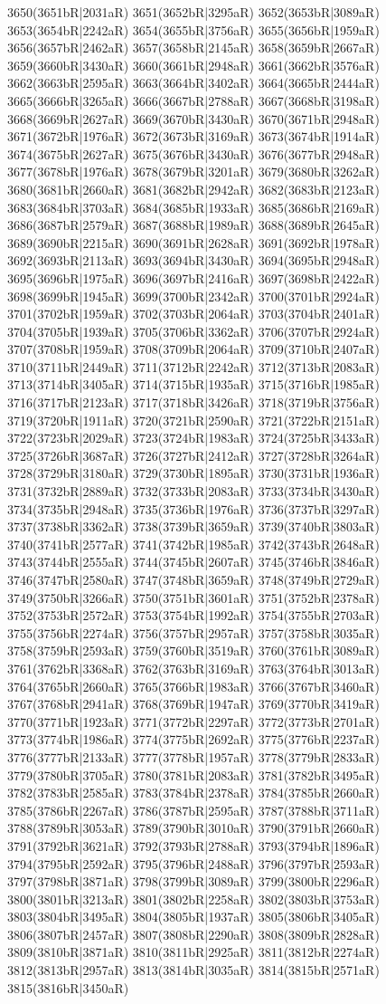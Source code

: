 3650(3651bR|2031aR) 3651(3652bR|3295aR) 3652(3653bR|3089aR) 3653(3654bR|2242aR) 3654(3655bR|3756aR) 3655(3656bR|1959aR) 3656(3657bR|2462aR) 3657(3658bR|2145aR) 3658(3659bR|2667aR) 3659(3660bR|3430aR) 3660(3661bR|2948aR) 3661(3662bR|3576aR) 3662(3663bR|2595aR) 3663(3664bR|3402aR) 3664(3665bR|2444aR) 3665(3666bR|3265aR) 3666(3667bR|2788aR) 3667(3668bR|3198aR) 3668(3669bR|2627aR) 3669(3670bR|3430aR) 3670(3671bR|2948aR) 3671(3672bR|1976aR) 3672(3673bR|3169aR) 3673(3674bR|1914aR) 3674(3675bR|2627aR) 3675(3676bR|3430aR) 3676(3677bR|2948aR) 3677(3678bR|1976aR) 3678(3679bR|3201aR) 3679(3680bR|3262aR) 3680(3681bR|2660aR) 3681(3682bR|2942aR) 3682(3683bR|2123aR) 3683(3684bR|3703aR) 3684(3685bR|1933aR) 3685(3686bR|2169aR) 3686(3687bR|2579aR) 3687(3688bR|1989aR) 3688(3689bR|2645aR) 3689(3690bR|2215aR) 3690(3691bR|2628aR) 3691(3692bR|1978aR) 3692(3693bR|2113aR) 3693(3694bR|3430aR) 3694(3695bR|2948aR) 3695(3696bR|1975aR) 3696(3697bR|2416aR) 3697(3698bR|2422aR) 3698(3699bR|1945aR) 3699(3700bR|2342aR) 3700(3701bR|2924aR) 3701(3702bR|1959aR) 3702(3703bR|2064aR) 3703(3704bR|2401aR) 3704(3705bR|1939aR) 3705(3706bR|3362aR) 3706(3707bR|2924aR) 3707(3708bR|1959aR) 3708(3709bR|2064aR) 3709(3710bR|2407aR) 3710(3711bR|2449aR) 3711(3712bR|2242aR) 3712(3713bR|2083aR) 3713(3714bR|3405aR) 3714(3715bR|1935aR) 3715(3716bR|1985aR) 3716(3717bR|2123aR) 3717(3718bR|3426aR) 3718(3719bR|3756aR) 3719(3720bR|1911aR) 3720(3721bR|2590aR) 3721(3722bR|2151aR) 3722(3723bR|2029aR) 3723(3724bR|1983aR) 3724(3725bR|3433aR) 3725(3726bR|3687aR) 3726(3727bR|2412aR) 3727(3728bR|3264aR) 3728(3729bR|3180aR) 3729(3730bR|1895aR) 3730(3731bR|1936aR) 3731(3732bR|2889aR) 3732(3733bR|2083aR) 3733(3734bR|3430aR) 3734(3735bR|2948aR) 3735(3736bR|1976aR) 3736(3737bR|3297aR) 3737(3738bR|3362aR) 3738(3739bR|3659aR) 3739(3740bR|3803aR) 3740(3741bR|2577aR) 3741(3742bR|1985aR) 3742(3743bR|2648aR) 3743(3744bR|2555aR) 3744(3745bR|2607aR) 3745(3746bR|3846aR) 3746(3747bR|2580aR) 3747(3748bR|3659aR) 3748(3749bR|2729aR) 3749(3750bR|3266aR) 3750(3751bR|3601aR) 3751(3752bR|2378aR) 3752(3753bR|2572aR) 3753(3754bR|1992aR) 3754(3755bR|2703aR) 3755(3756bR|2274aR) 3756(3757bR|2957aR) 3757(3758bR|3035aR) 3758(3759bR|2593aR) 3759(3760bR|3519aR) 3760(3761bR|3089aR) 3761(3762bR|3368aR) 3762(3763bR|3169aR) 3763(3764bR|3013aR) 3764(3765bR|2660aR) 3765(3766bR|1983aR) 3766(3767bR|3460aR) 3767(3768bR|2941aR) 3768(3769bR|1947aR) 3769(3770bR|3419aR) 3770(3771bR|1923aR) 3771(3772bR|2297aR) 3772(3773bR|2701aR) 3773(3774bR|1986aR) 3774(3775bR|2692aR) 3775(3776bR|2237aR) 3776(3777bR|2133aR) 3777(3778bR|1957aR) 3778(3779bR|2833aR) 3779(3780bR|3705aR) 3780(3781bR|2083aR) 3781(3782bR|3495aR) 3782(3783bR|2585aR) 3783(3784bR|2378aR) 3784(3785bR|2660aR) 3785(3786bR|2267aR) 3786(3787bR|2595aR) 3787(3788bR|3711aR) 3788(3789bR|3053aR) 3789(3790bR|3010aR) 3790(3791bR|2660aR) 3791(3792bR|3621aR) 3792(3793bR|2788aR) 3793(3794bR|1896aR) 3794(3795bR|2592aR) 3795(3796bR|2488aR) 3796(3797bR|2593aR) 3797(3798bR|3871aR) 3798(3799bR|3089aR) 3799(3800bR|2296aR) 3800(3801bR|3213aR) 3801(3802bR|2258aR) 3802(3803bR|3753aR) 3803(3804bR|3495aR) 3804(3805bR|1937aR) 3805(3806bR|3405aR) 3806(3807bR|2457aR) 3807(3808bR|2290aR) 3808(3809bR|2828aR) 3809(3810bR|3871aR) 3810(3811bR|2925aR) 3811(3812bR|2274aR) 3812(3813bR|2957aR) 3813(3814bR|3035aR) 3814(3815bR|2571aR) 3815(3816bR|3450aR) 